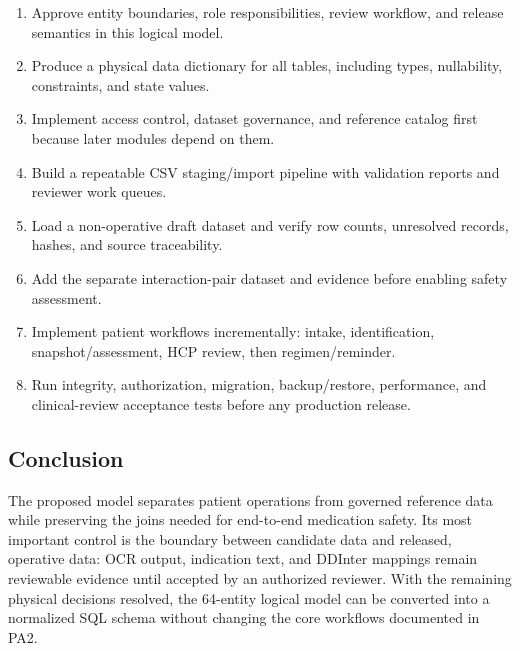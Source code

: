 \begin{enumerate}
  \item Approve entity boundaries, role responsibilities, review workflow, and release semantics in this logical model.
  \item Produce a physical data dictionary for all tables, including types, nullability, constraints, and state values.
  \item Implement access control, dataset governance, and reference catalog first because later modules depend on them.
  \item Build a repeatable CSV staging/import pipeline with validation reports and reviewer work queues.
  \item Load a non-operative draft dataset and verify row counts, unresolved records, hashes, and source traceability.
  \item Add the separate interaction-pair dataset and evidence before enabling safety assessment.
  \item Implement patient workflows incrementally: intake, identification, snapshot/assessment, HCP review, then regimen/reminder.
  \item Run integrity, authorization, migration, backup/restore, performance, and clinical-review acceptance tests before any production release.
\end{enumerate}

\subsection{Conclusion}

The proposed model separates patient operations from governed reference data while preserving the joins needed for end-to-end medication safety. Its most important control is the boundary between candidate data and released, operative data: OCR output, indication text, and DDInter mappings remain reviewable evidence until accepted by an authorized reviewer. With the remaining physical decisions resolved, the 64-entity logical model can be converted into a normalized SQL schema without changing the core workflows documented in PA2.

